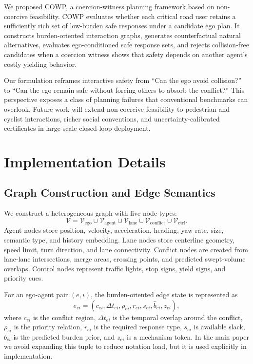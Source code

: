 \documentclass[10pt]{article}
\begin{document}
We proposed COWP, a coercion-witness planning framework based on non-coercive feasibility. COWP evaluates whether each critical road user retains a sufficiently rich set of low-burden safe responses under a candidate ego plan. It constructs burden-oriented interaction graphs, generates counterfactual natural alternatives, evaluates ego-conditioned safe response sets, and rejects collision-free candidates when a coercion witness shows that safety depends on another agent's costly yielding behavior.

Our formulation reframes interactive safety from ``Can the ego avoid collision?'' to ``Can the ego remain safe without forcing others to absorb the conflict?'' This perspective exposes a class of planning failures that conventional benchmarks can overlook. Future work will extend non-coercive feasibility to pedestrian and cyclist interactions, richer social conventions, and uncertainty-calibrated certificates in large-scale closed-loop deployment.

\appendix

\section{Implementation Details}
\label{app:implementation_details}

\subsection{Graph Construction and Edge Semantics}
\label{app:graph_details}

We construct a heterogeneous graph with five node types:
\begin{equation}
    \mathcal{V}
    =
    \mathcal{V}_{\mathrm{ego}}
    \cup
    \mathcal{V}_{\mathrm{agent}}
    \cup
    \mathcal{V}_{\mathrm{lane}}
    \cup
    \mathcal{V}_{\mathrm{conflict}}
    \cup
    \mathcal{V}_{\mathrm{ctrl}} .
\end{equation}
Agent nodes store position, velocity, acceleration, heading, yaw rate, size, semantic type, and history embedding. Lane nodes store centerline geometry, speed limit, turn direction, and lane connectivity. Conflict nodes are created from lane-lane intersections, merge areas, crossing points, and predicted swept-volume overlaps. Control nodes represent traffic lights, stop signs, yield signs, and priority cues.

For an ego-agent pair $(e,i)$, the burden-oriented edge state is represented as
\begin{equation}
    e_{ei}
    =
    (
    c_{ei},
    \Delta t_{ei},
    \rho_{ei},
    r_{ei},
    s_{ei},
    \widehat{b}_{ei},
    z_{ei}
    ),
\end{equation}
where $c_{ei}$ is the conflict region, $\Delta t_{ei}$ is the temporal overlap around the conflict, $\rho_{ei}$ is the priority relation, $r_{ei}$ is the required response type, $s_{ei}$ is available slack, $\widehat{b}_{ei}$ is the predicted burden prior, and $z_{ei}$ is a mechanism token. In the main paper we avoid expanding this tuple to reduce notation load, but it is used explicitly in implementation.
\end{document}
